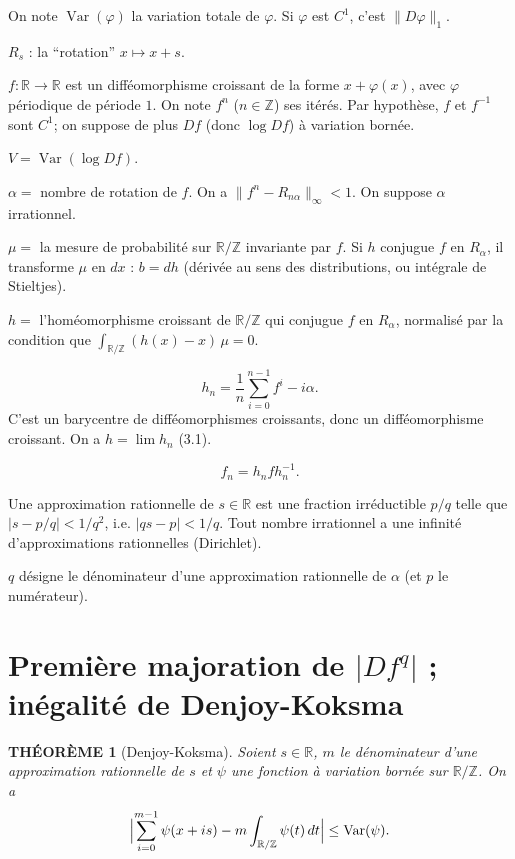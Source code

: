 \documentclass[12pt]{amsart}
\theoremstyle{plain}
\newtheorem{theoreme}{TH\'{E}OR\`{E}ME}[section]
\theoremstyle{remark}
\DeclareMathOperator*{\Var}{Var}
\begin{document}
On note $\Var(\varphi)$ la variation totale de $\varphi$. Si $\varphi$ est $C^{1}$, c'est $\|D\varphi\|_{1}$.

$R_{s}$ : la ``rotation'' $x \mapsto x + s$.

$f : \mathbb{R} \to \mathbb{R}$ est un diff\'{e}omorphisme croissant de la forme $x + \varphi(x)$, avec $\varphi$ p\'{e}riodique de p\'{e}riode $1$. On note $f^{n}$ ($n \in \mathbb{Z}$) ses it\'{e}r\'{e}s. Par hypoth\`{e}se, $f$ et $f^{-1}$ sont $C^{1}$; on suppose de plus $Df$ (donc $\log Df$) \`{a} variation born\'{e}e.

$V = \Var(\log Df)$.

$\alpha =$ nombre de rotation de $f$. On a $\|f^{n} - R_{n\alpha}\|_{\infty} < 1$. On suppose $\alpha$ irrationnel.

$\mu =$ la mesure de probabilit\'{e} sur $\mathbb{R}/\mathbb{Z}$ invariante par $f$. Si $h$ conjugue $f$ en $R_{\alpha}$, il transforme $\mu$ en $dx$ : $b = dh$ (d\'{e}riv\'{e}e au sens des distributions, ou int\'{e}grale de Stieltjes).

$h =$ l'hom\'{e}omorphisme croissant de $\mathbb{R}/\mathbb{Z}$ qui conjugue $f$ en $R_{\alpha}$, normalis\'{e} par la condition que $\int_{\mathbb{R}/\mathbb{Z}} (h(x)-x)\,\mu = 0$.

\[
h_{n} = \frac{1}{n} \sum_{i=0}^{n-1} f^{i} - i\alpha .
\]
C'est un barycentre de diff\'{e}omorphismes croissants, donc un diff\'{e}omorphisme croissant. On a $h = \lim h_{n}$ (3.1).

\[
f_{n} = h_{n}fh_{n}^{-1} .
\]

Une approximation rationnelle de $s \in \mathbb{R}$ est une fraction irr\'{e}ductible $p/q$ telle que $|s - p/q| < 1/q^{2}$, i.e. $|qs - p| < 1/q$. Tout nombre irrationnel a une infinit\'{e} d'approximations rationnelles (Dirichlet).

$q$ d\'{e}signe le d\'{e}nominateur d'une approximation rationnelle de $\alpha$ (et $p$ le num\'{e}rateur).

\section{Premi\`{e}re majoration de $|Df^{q}|$ ; in\'{e}galit\'{e} de Denjoy-Koksma}

\begin{theoreme}[Denjoy-Koksma]\label{thm:denjoy-koksma}
Soient $s \in \mathbb{R}$, $m$ le d\'{e}nominateur d'une approximation rationnelle de $s$ et $\psi$ une fonction \`{a} variation born\'{e}e sur $\mathbb{R}/\mathbb{Z}$. On a
\[
\Bigl|\sum_{i=0}^{m-1} \psi(x+is) - m \int_{\mathbb{R}/\mathbb{Z}} \psi(t)\,dt\Bigr| \leq \Var(\psi) .
\]
\end{theoreme}
\end{document}
